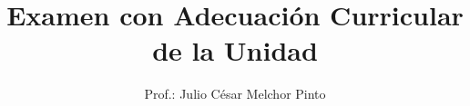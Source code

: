 \documentclass[12pt,addpoints]{evalua}
\title{Examen con Adecuación Curricular\\ de la Unidad}
\author{Prof.: Julio César Melchor Pinto}
\begin{document}
\begin{questions}
    
\end{questions}
\end{document}

